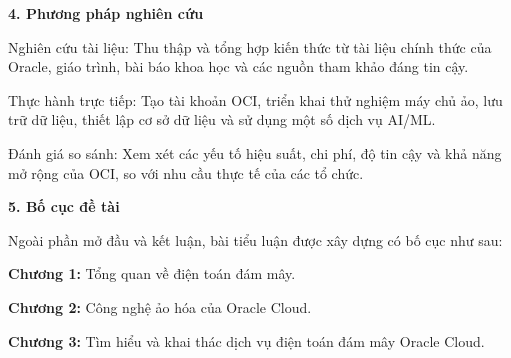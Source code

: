 \textbf{4. Phương pháp nghiên cứu}

Nghiên cứu tài liệu: Thu thập và tổng hợp kiến thức từ tài liệu chính thức của Oracle, giáo trình, bài báo khoa học và các nguồn tham khảo đáng tin cậy.

Thực hành trực tiếp: Tạo tài khoản OCI, triển khai thử nghiệm máy chủ ảo, lưu trữ dữ liệu, thiết lập cơ sở dữ liệu và sử dụng một số dịch vụ AI/ML.

Đánh giá so sánh: Xem xét các yếu tố hiệu suất, chi phí, độ tin cậy và khả năng mở rộng của OCI, so với nhu cầu thực tế của các tổ chức.

\textbf{5. Bố cục đề tài}

Ngoài phần mở đầu và kết luận, bài tiểu luận được xây dựng có bố cục như sau:

\textbf{Chương 1: }Tổng quan về điện toán đám mây.

\textbf{Chương 2: }Công nghệ ảo hóa của Oracle Cloud.

\textbf{Chương 3: }Tìm hiểu và khai thác dịch vụ điện toán đám mây Oracle Cloud.
